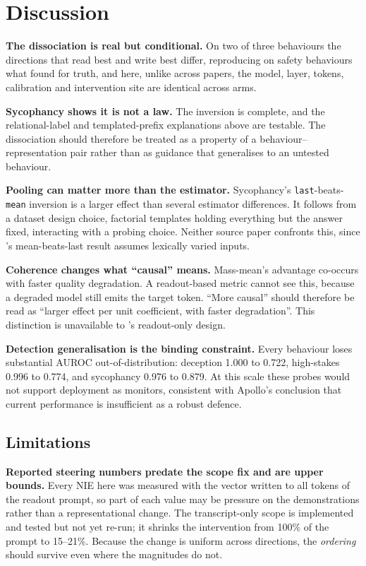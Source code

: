 \documentclass[conference]{IEEEtran}
\begin{document}
\section{Discussion}

\textbf{The dissociation is real but conditional.} On two of three behaviours the
directions that read best and write best differ, reproducing on safety behaviours
what \citet{marks2024} found for truth, and here, unlike across papers, the
model, layer, tokens, calibration and intervention site are identical across arms.

\textbf{Sycophancy shows it is not a law.} The inversion is complete, and the
relational-label and templated-prefix explanations above are testable. The
dissociation should therefore be treated as a property of a
behaviour--representation pair rather than as guidance that generalises to an
untested behaviour.

\textbf{Pooling can matter more than the estimator.} Sycophancy's
\texttt{last}-beats-\texttt{mean} inversion is a larger effect than several
estimator differences. It follows from a dataset design choice, factorial templates
holding everything but the answer fixed, interacting with a probing choice. Neither
source paper confronts this, since \citeauthor{mckenzie2025}'s mean-beats-last result
assumes lexically varied inputs.

\textbf{Coherence changes what ``causal'' means.} Mass-mean's advantage co-occurs
with faster quality degradation. A readout-based metric cannot see this, because a
degraded model still emits the target token. ``More causal'' should therefore be read
as ``larger effect per unit coefficient, with faster degradation''. This distinction
is unavailable to \citeauthor{marks2024}'s readout-only design.

\textbf{Detection generalisation is the binding constraint.} Every behaviour loses
substantial AUROC out-of-distribution: deception 1.000 to 0.722, high-stakes 0.996
to 0.774, and sycophancy 0.976 to 0.879. At this scale these probes would not
support deployment as monitors, consistent with Apollo's conclusion that current
performance is insufficient as a robust defence.

\subsection{Limitations}
\label{sec:limitations}

\textbf{Reported steering numbers predate the scope fix and are upper bounds.}
Every NIE here was measured with the vector written to all tokens of the readout
prompt, so part of each value may be pressure on the demonstrations rather than a
representational change. The transcript-only scope is implemented and tested but not
yet re-run; it shrinks the intervention from 100\% of the prompt to 15--21\%. Because
the change is uniform across directions, the \emph{ordering} should survive even
where the magnitudes do not.
\end{document}
